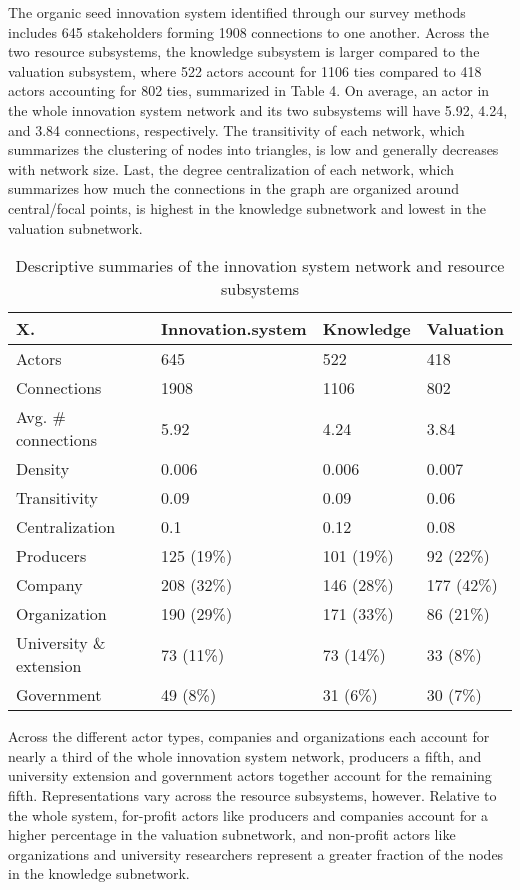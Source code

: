 \documentclass[twoside,12pt,final]{ucthesis-CA2012}
\begin{document}
\begin{ucmainmatter}
The organic seed innovation system identified through our survey methods
includes 645 stakeholders forming 1908 connections to one another.
Across the two resource subsystems, the knowledge subsystem is larger
compared to the valuation subsystem, where 522 actors account for 1106
ties compared to 418 actors accounting for 802 ties, summarized in Table
4. On average, an actor in the whole innovation system network and its
two subsystems will have 5.92, 4.24, and 3.84 connections, respectively.
The transitivity of each network, which summarizes the clustering of
nodes into triangles, is low and generally decreases with network size.
Last, the degree centralization of each network, which summarizes how
much the connections in the graph are organized around central/focal
points, is highest in the knowledge subnetwork and lowest in the
valuation subnetwork.
\begin{table}

\caption{\label{tab:unnamed-chunk-19}Descriptive summaries of the innovation system network and resource subsystems}
\centering
\begin{tabular}[t]{llll}
\toprule
X. & Innovation.system & Knowledge & Valuation\\
\midrule
Actors & 645 & 522 & 418\\
Connections & 1908 & 1106 & 802\\
Avg. \# connections & 5.92 & 4.24 & 3.84\\
Density & 0.006 & 0.006 & 0.007\\
Transitivity & 0.09 & 0.09 & 0.06\\
\addlinespace
Centralization & 0.1 & 0.12 & 0.08\\
Producers & 125 (19\%) & 101 (19\%) & 92 (22\%)\\
Company & 208 (32\%) & 146 (28\%) & 177 (42\%)\\
Organization & 190 (29\%) & 171 (33\%) & 86 (21\%)\\
University \&
extension & 73 (11\%) & 73 (14\%) & 33 (8\%)\\
\addlinespace
Government & 49 (8\%) & 31 (6\%) & 30 (7\%)\\
\bottomrule
\end{tabular}
\end{table}
Across the different actor types, companies and organizations each
account for nearly a third of the whole innovation system network,
producers a fifth, and university extension and government actors
together account for the remaining fifth. Representations vary across
the resource subsystems, however. Relative to the whole system,
for-profit actors like producers and companies account for a higher
percentage in the valuation subnetwork, and non-profit actors like
organizations and university researchers represent a greater fraction of
the nodes in the knowledge subnetwork.


\end{ucmainmatter}
\end{document}
